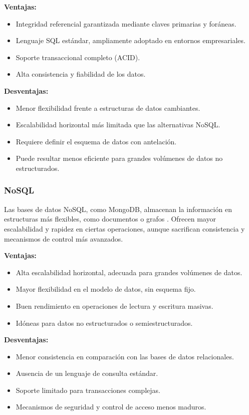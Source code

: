 \textbf{Ventajas:}
\begin{itemize}
    \item Integridad referencial garantizada mediante claves primarias y foráneas.
    \item Lenguaje SQL estándar, ampliamente adoptado en entornos empresariales.
    \item Soporte transaccional completo (ACID).
    \item Alta consistencia y fiabilidad de los datos.
\end{itemize}

\textbf{Desventajas:}
\begin{itemize}
    \item Menor flexibilidad frente a estructuras de datos cambiantes.
    \item Escalabilidad horizontal más limitada que las alternativas NoSQL.
    \item Requiere definir el esquema de datos con antelación.
    \item Puede resultar menos eficiente para grandes volúmenes de datos no estructurados.
\end{itemize}

\subsubsection{NoSQL}
Las bases de datos NoSQL, como MongoDB, almacenan la información en estructuras más flexibles, como documentos o grafos \cite{mongodbDocs}. Ofrecen mayor escalabilidad y rapidez en ciertas operaciones, aunque sacrifican consistencia y mecanismos de control más avanzados.

\textbf{Ventajas:}
\begin{itemize}
    \item Alta escalabilidad horizontal, adecuada para grandes volúmenes de datos.
    \item Mayor flexibilidad en el modelo de datos, sin esquema fijo.
    \item Buen rendimiento en operaciones de lectura y escritura masivas.
    \item Idóneas para datos no estructurados o semiestructurados.
\end{itemize}

\textbf{Desventajas:}
\begin{itemize}
    \item Menor consistencia en comparación con las bases de datos relacionales.
    \item Ausencia de un lenguaje de consulta estándar.
    \item Soporte limitado para transacciones complejas.
    \item Mecanismos de seguridad y control de acceso menos maduros.
\end{itemize}

